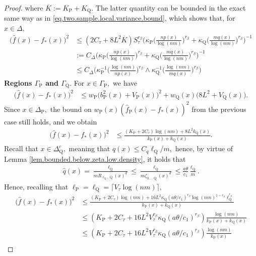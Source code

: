 \documentclass[10pt,a4paper]{amsart}
\renewcommand{\P}{\operatorname{P}}
\newcommand{\Q}{\operatorname{Q}}
\renewcommand{\k}{\kappa}
\newcommand{\ol}{\overline}
\newcommand{\wh}{\widehat}
\begin{document}
\begin{proof}
    where $\ol K := K_{\P} + K_{\Q}.$ The latter quantity can be bounded in the exact same way as in \eqref{eq.two.sample.local.variance.bound}, which shows that, for $x \in \Delta,$
    \begin{align*}
        \big(\wh f(x) - f_*(x)\big)^2 &\leq (2C_\tau + 8L^2\ol K)S_\tau^{r_\beta} \Bigg(\k_{\P}\bigg(\frac{np(x)}{\log(nm)}\bigg)^{r_\beta} + \k_{\Q}\bigg(\frac{m q(x)}{\log(nm)}\bigg)^{r_\beta}\Bigg)^{-1}\\
        &:= C_{\Delta}\Bigg(\k_{\P}\bigg(\frac{np(x)}{\log(nm)}\bigg)^{r_\beta} + \k_{\Q}\bigg(\frac{m q(x)}{\log(nm)}\bigg)^{r_\beta}\Bigg)^{-1}\\
        &\leq C_{\Delta}\bigg(\k_{\P}^{-1}\Big(\frac{\log(nm)}{np(x)}\Big)^{r_\beta}\wedge\k_{\Q}^{-1}\Big(\frac{\log(nm)}{mq(x)}\Big)^{r_\beta}\bigg)
    \end{align*}
    \noindent\textbf{Regions $\Gamma_{\P}$ and $\Gamma_{\Q}.$} For $x \in \Gamma_{\P},$ we have
    \begin{align*}
        \big(\wh f(x) - f_*(x)\big)^2 &\leq w_{\P}\big(b_{\P}^2(x) + V_{\P}(x)\big)^2 + w_{\Q}(x)\big(8L^2 + V_{\Q}(x)\big).
    \end{align*}
    Since $x \in \Delta_{\P},$ the bound on $w_{\P}(x)(\wh f_{\P}(x) - f_*(x))^2$ from the previous case still holds, and we obtain
    \begin{align*}
        \big(\wh f(x) - f_*(x)\big)^2 &\leq \frac{(K_{\P} + 2C_\tau) \log(nm) + 8L^2k_{\Q}(x)}{k_{\P}(x) + k_{\Q}(x)}.
    \end{align*}
    Recall that $x \in \Delta_{\Q}^c,$ meaning that $q(x) \leq C_q\ell_{\Q}/m,$ hence, by virtue of Lemma \ref{lem.bounded.below.zeta.low.density}, it holds that
    \begin{align}
        \label{eq.ub.wh.q.low.density}
        \wh q(x) = \frac{\ell_{\Q}}{mR_{\ell_{\Q}, \Q}(x)^d} \leq \frac{\ell_{\Q}}{m\zeta_{h_-, \Q}(x)^d} \leq \frac{a\theta}{c_1}\frac{\ell_{\Q}}{m}.
    \end{align}
    Hence, recalling that $\ell_{\P} = \ell_{\Q} = \lceil V_\tau \log(nm)\rceil,$
    \begin{align*}
        \big(\wh f(x) - f_*(x)\big)^2 &\leq \frac{(K_{\P} + 2C_\tau) \log(nm) + 16L^2\k_{\Q}(a\theta/c_1)^{r_\beta}\log(nm)^{1-r_\beta}\ell_{\Q}^{r_\beta}}{k_{\P}(x) + k_{\Q}(x)}\\
        &\leq (K_{\P} + 2C_\tau + 16L^2V_\tau^{r_\beta}\k_{\Q}(a\theta/c_1)^{r_\beta}) \frac{\log(nm)}{k_{\P}(x) + k_{\Q}(x)}\\
        &\leq (K_{\P} + 2C_\tau + 16L^2V_\tau^{r_\beta}\k_{\Q}(a\theta/c_1)^{r_\beta})\frac{\log(nm)}{k_{\P}(x)}\\

\end{align*}
\end{proof}
\end{document}

